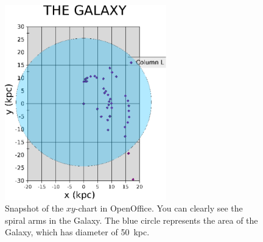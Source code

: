 \begin{figure}[ht]
\begin{center}
\includegraphics[width=7cm]{../figures/galaxopenoffice1.pdf}
\caption{Snapshot of the $xy$-chart in OpenOffice.  You can clearly
  see the spiral arms in the Galaxy.  The blue circle represents the
  area of the Galaxy, which has diameter of 50~kpc.}
\label{galax}
\end{center}
\end{figure}
